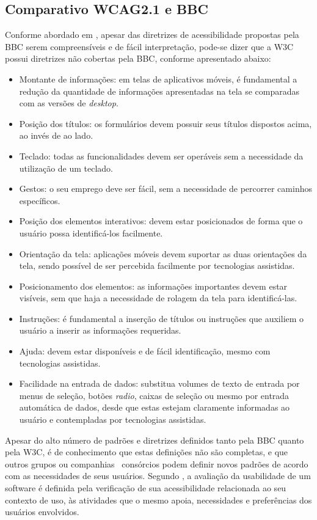 \subsection{Comparativo WCAG2.1 e BBC}
Conforme abordado em \cite{camilamaster}, apesar das diretrizes de acessibilidade propostas pela BBC serem compreensíveis e de fácil interpretação, pode-se dizer que a W3C possui diretrizes não cobertas pela BBC, conforme apresentado abaixo:
\begin{itemize}
	\item Montante de informações: em telas de aplicativos móveis, é fundamental a redução da quantidade de informações apresentadas na tela se comparadas com as versões de \textit{desktop}.
	\item Posição dos títulos: os formulários devem possuir seus títulos dispostos acima, ao invés de ao lado.
	\item Teclado: todas as funcionalidades devem ser operáveis sem a necessidade da utilização de um teclado.
	\item Gestos: o seu emprego deve ser fácil, sem a necessidade de percorrer caminhos específicos.
	\item Posição dos elementos interativos: devem estar posicionados de forma que o usuário possa identificá-los facilmente.
	\item Orientação da tela: aplicações móveis devem suportar as duas orientações da tela, sendo possível de ser percebida facilmente por tecnologias assistidas.
	\item Posicionamento dos elementos: as informações importantes devem estar visíveis, sem que haja a necessidade de rolagem da tela para identificá-las.
	\item Instruções: é fundamental a inserção de títulos ou instruções que auxiliem o usuário a inserir as informações requeridas.
	\item Ajuda: devem estar disponíveis e de fácil identificação, mesmo com tecnologias assistidas.
	\item Facilidade na entrada de dados: substitua volumes de texto de entrada por menus de seleção, botões \textit{radio}, caixas de seleção ou mesmo por entrada automática de dados, desde que estas estejam claramente informadas ao usuário e contempladas por tecnologias assistidas.
\end{itemize}

Apesar do alto número de padrões e diretrizes definidos tanto pela BBC quanto pela W3C, é de conhecimento que estas definições não são completas, e que outros grupos ou companhias \ consórcios podem definir novos padrões de acordo com as necessidades de seus usuários. Segundo \cite{meloihc2004}, a avaliação da usabilidade de um software é definida pela verificação de sua acessibilidade relacionada ao seu contexto de uso, às atividades que o mesmo apoia, necessidades e preferências dos usuários envolvidos.  



